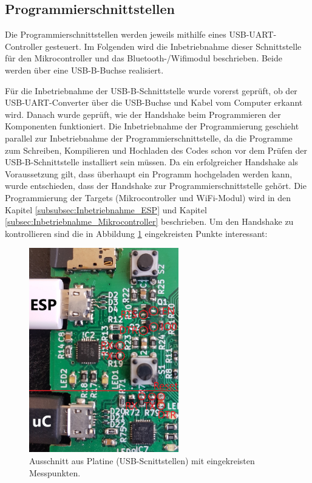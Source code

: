 \newpage
\subsection{Programmierschnittstellen}
\label{sec:Inbetriebnahme_Programmierschnittstellen}

Die Programmierschnittstellen werden jeweils mithilfe eines USB-UART-Controller gesteuert. Im Folgenden wird die Inbetriebnahme dieser Schnittstelle für den Mikrocontroller und das Bluetooth-/Wifimodul beschrieben. Beide werden über eine USB-B-Buchse realisiert.

Für die Inbetriebnahme der USB-B-Schnittstelle wurde vorerst geprüft, ob der USB-UART-Converter über die USB-Buchse und Kabel vom Computer erkannt wird. Danach wurde geprüft, wie der Handshake beim Programmieren der Komponenten funktioniert. Die Inbetriebnahme der Programmierung geschieht parallel zur Inbetriebnahme der Programmierschnittstelle, da die Programme zum Schreiben, Kompilieren und Hochladen des Codes schon vor dem Prüfen der USB-B-Schnittstelle installiert sein müssen. Da ein erfolgreicher Handshake als Voraussetzung gilt, dass überhaupt ein Programm hochgeladen werden kann, wurde entschieden, dass der Handshake zur Programmierschnittstelle gehört. Die Programmierung der Targets (Mikrocontroller und WiFi-Modul) wird in den Kapitel \ref{subsubsec:Inbetriebnahme_ESP} und Kapitel \ref{subsec:Inbetriebnahme_Mikrocontroller} beschrieben. Um den Handshake zu kontrollieren sind die in Abbildung \ref{fig:USB_B_Print} eingekreisten Punkte interessant:


\begin{figure}[h!]
\center
\includegraphics[width = 0.58\textwidth]{graphics/USB_B_Print}
\caption{Ausschnitt aus Platine (USB-Scnittstellen) mit eingekreisten Messpunkten.}
\label{fig:USB_B_Print}
\end{figure}

